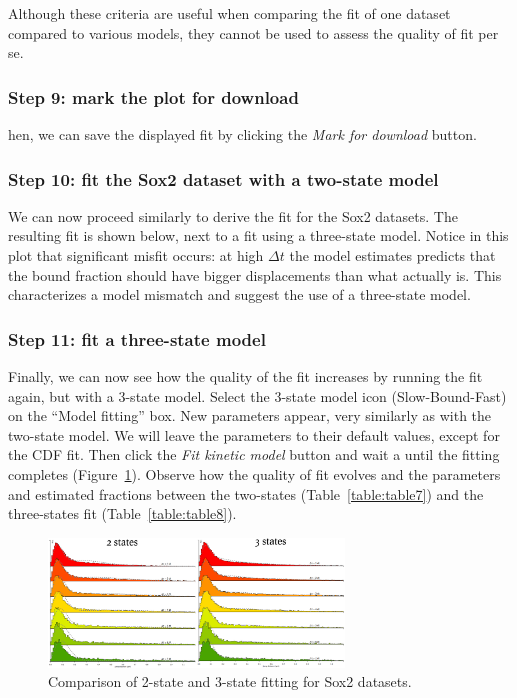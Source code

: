 Although these criteria are useful when comparing the fit of one dataset compared to various models, they cannot be used to assess the quality of fit per se.

\subsubsection{Step 9: mark the plot for download}
hen, we can save the displayed fit by clicking the \textit{Mark for download} button.

\subsubsection{Step 10: fit the Sox2 dataset with a two-state model}
We can now proceed similarly to derive the fit for the Sox2 datasets. The resulting fit is shown below, next to a fit using a three-state model. Notice in this plot that significant misfit occurs: at high \(\Delta t\) the model estimates predicts that the bound fraction should have bigger displacements than what actually is. This characterizes a model mismatch and suggest the use of a three-state model.

\subsubsection{Step 11: fit a three-state model}
Finally, we can now see how the quality of the fit increases by running the fit again, but with a 3-state model. Select the 3-state model icon (Slow-Bound-Fast) on the ``Model fitting'' box. New parameters appear, very similarly as with the two-state model. We will leave the parameters to their default values, except for the CDF fit. Then click the \textit{Fit kinetic model} button and wait a until the fitting completes (Figure~\ref{fig:tuto13}). Observe how the quality of fit evolves and the parameters and estimated fractions between the two-states (Table~\ref{table:table7}) and the three-states fit (Table~\ref{table:table8}).

\begin{figure}[h!]
\centering
\includegraphics[width=0.7\textwidth]{../SPTGUI/static/SPTGUI/img/tutorial/0.7/tuto13.png}
\caption{\label{fig:tuto13}Comparison of 2-state and 3-state fitting for Sox2 datasets.}
\end{figure}

